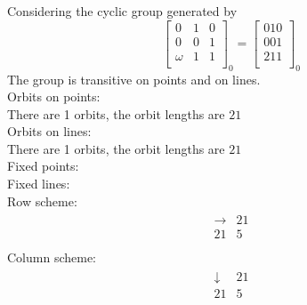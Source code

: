 Considering the cyclic group generated by
$$
\left[
\begin{array}{*{3}{r}}
0 & 1 & 0\\
0 & 0 & 1\\
\omega  & 1 & 1\\
\end{array}
\right]
_{0}
=
\left[
\begin{array}{c}
010\\
001\\
211\\
\end{array}
\right]
_{0}
$$
The group is transitive on points and on lines.\\
Orbits on points:\\
There are 1 orbits, the orbit lengths are $21$ \\
Orbits on lines:\\
There are 1 orbits, the orbit lengths are $21$ \\
Fixed points:\\
Fixed lines:\\
Row scheme:\\
\begin{align*}
\begin{array}{r|*{1}{r}}
\rightarrow  &     21\\
\hline
    21 &            5\\
\end{array}
\end{align*}
Column scheme:\\
\begin{align*}
\begin{array}{r|*{1}{r}}
\downarrow  &     21\\
\hline
    21 &            5\\
\end{array}
\end{align*}
